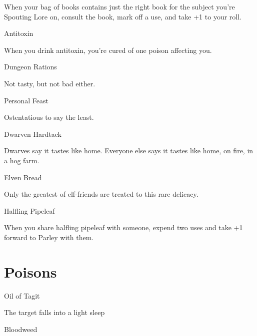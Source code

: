  

When your bag of books contains just the right book for the subject you're Spouting Lore on, consult the book, mark off a use, and take +1 to your roll.

 

Antitoxin	 

 

When you drink antitoxin, you're cured of one poison affecting you.

 

Dungeon Rations	 

 

Not tasty, but not bad either.

 

Personal Feast	 

 

Ostentatious to say the least.

 

Dwarven Hardtack	 

 

Dwarves say it tastes like home. Everyone else says it tastes like home, on fire, in a hog farm.

 

Elven Bread	 

 

Only the greatest of elf-friends are treated to this rare delicacy.

 

Halfling Pipeleaf	 

 

When you share halfling pipeleaf with someone, expend two uses and take +1 forward to Parley with them.

 
\section{Poisons}   
 

Oil of Tagit	 

 

The target falls into a light sleep

 

Bloodweed	 

